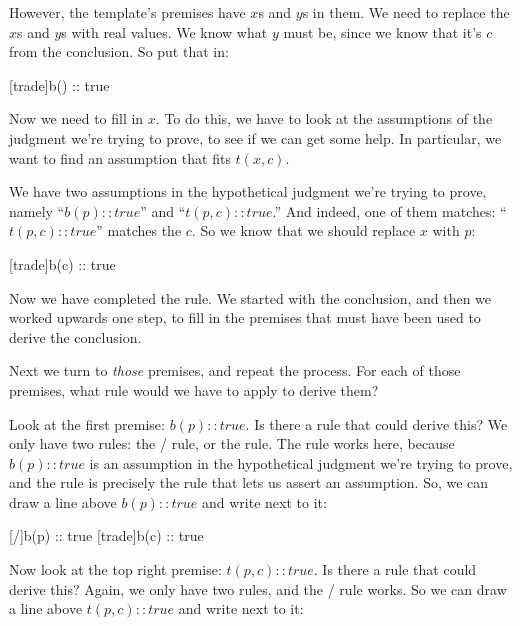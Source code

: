 \documentclass[../../../main.tex]{subfiles}
\begin{document}
\noindent
However, the template's premises have $x$s and $y$s in them. We need to replace the $x$s and $y$s with real values. We know what $y$ must be, since we know that it's $c$ from the conclusion. So put that in:

\begin{prooftree*}
  [trade]{b() :: true}
\end{prooftree*}

\noindent
Now we need to fill in $x$. To do this, we have to look at the assumptions of the judgment we're trying to prove, to see if we can get some help. In particular, we want to find an assumption that fits $t(x, c)$. 

We have two assumptions in the hypothetical judgment we're trying to prove, namely ``$b(p) :: true$'' and ``$t(p, c) :: true$.'' And indeed, one of them matches: ``$t(p, c) :: true$'' matches the $c$. So we know that we should replace $x$ with $p$:

\begin{prooftree*}
  [trade]{b(c) :: true}
\end{prooftree*}

\noindent
Now we have completed the  rule. We started with the conclusion, and then we worked upwards one step, to fill in the premises that must have been used to derive the conclusion.

Next we turn to \emph{those} premises, and repeat the process. For each of those premises, what rule would we have to apply to derive them? 

Look at the first premise: $b(p) :: true$. Is there a rule that could derive this? We only have two rules: the \startrule/ rule, or the  rule. The  rule works here, because $b(p) :: true$ is an assumption in the hypothetical judgment we're trying to prove, and the  rule is precisely the rule that lets us assert an assumption. So, we can draw a line above $b(p) :: true$ and write  next to it:

\begin{prooftree*}
  \hypo{}
  [\startrule/]{b(p) :: true}
  [trade]{b(c) :: true}
\end{prooftree*}

\noindent
Now look at the top right premise: $t(p, c) :: true$. Is there a rule that could derive this? Again, we only have two rules, and the \startrule/ rule works. So we can draw a line above $t(p, c) :: true$ and write  next to it:
\end{document}
